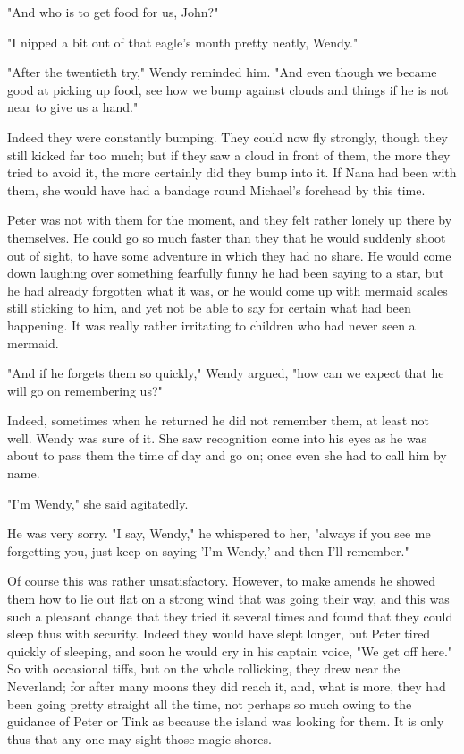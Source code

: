 "And who is to get food for us, John?"


"I nipped a bit out of that eagle's mouth pretty neatly, Wendy."


"After the twentieth try," Wendy reminded him. "And even though we became
good at picking up food, see how we bump against clouds and things if he
is not near to give us a hand."


Indeed they were constantly bumping. They could now fly strongly, though
they still kicked far too much; but if they saw a cloud in front of them,
the more they tried to avoid it, the more certainly did they bump into it.
If Nana had been with them, she would have had a bandage round Michael's
forehead by this time.


Peter was not with them for the moment, and they felt rather lonely up
there by themselves. He could go so much faster than they that he would
suddenly shoot out of sight, to have some adventure in which they had no
share. He would come down laughing over something fearfully funny he had
been saying to a star, but he had already forgotten what it was, or he
would come up with mermaid scales still sticking to him, and yet not be
able to say for certain what had been happening. It was really rather
irritating to children who had never seen a mermaid.


"And if he forgets them so quickly," Wendy argued, "how can we expect that
he will go on remembering us?"


Indeed, sometimes when he returned he did not remember them, at least not
well. Wendy was sure of it. She saw recognition come into his eyes as he
was about to pass them the time of day and go on; once even she had to
call him by name.


"I'm Wendy," she said agitatedly.


He was very sorry. "I say, Wendy," he whispered to her, "always if you see
me forgetting you, just keep on saying 'I'm Wendy,' and then I'll
remember."


Of course this was rather unsatisfactory. However, to make amends he
showed them how to lie out flat on a strong wind that was going their way,
and this was such a pleasant change that they tried it several times and
found that they could sleep thus with security. Indeed they would have
slept longer, but Peter tired quickly of sleeping, and soon he would cry
in his captain voice, "We get off here." So with occasional tiffs, but on
the whole rollicking, they drew near the Neverland; for after many moons
they did reach it, and, what is more, they had been going pretty straight
all the time, not perhaps so much owing to the guidance of Peter or Tink
as because the island was looking for them. It is only thus that any one
may sight those magic shores.


